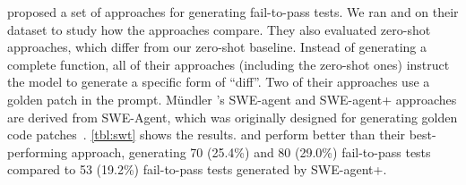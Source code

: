 \citet{mundler2024swtbench} proposed a set of approaches for
generating fail-to-pass tests. We ran \solx and \soly on their dataset to study
how the approaches compare. They also evaluated zero-shot approaches, which
differ from our zero-shot baseline. Instead of generating a complete function,
all of their approaches (including the zero-shot ones) instruct the model to
generate a specific form of ``diff''. Two of their approaches use a golden patch
in the prompt. M{\"u}ndler \etal's SWE-agent and SWE-agent+ approaches are
derived from SWE-Agent, which was originally designed for generating golden code
patches~\cite{sweagent2}. \cref{tbl:swt} shows the results. \solx and \soly
perform better than their best-performing approach, generating 70 (25.4\%) and
80 (29.0\%) fail-to-pass tests compared to 53 (19.2\%) fail-to-pass tests
generated by SWE-agent+.


